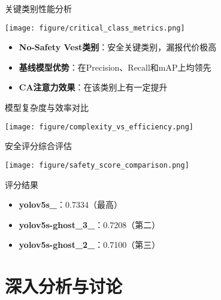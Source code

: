 \documentclass[aspectratio=169]{beamer}
\begin{document}
\begin{frame}{关键类别性能分析}
    \begin{center}
        \texttt{[image: figure/critical\_class\_metrics.png]}
    \end{center}
    
    \begin{itemize}
        \item \textbf{No-Safety Vest类别}：安全关键类别，漏报代价极高
        \item \textbf{基线模型优势}：在Precision、Recall和mAP上均领先
        \item \textbf{CA注意力效果}：在该类别上有一定提升
    \end{itemize}
\end{frame}

\begin{frame}{模型复杂度与效率对比}
    \begin{center}
        \texttt{[image: figure/complexity\_vs\_efficiency.png]}
    \end{center}
\end{frame}

\begin{frame}{安全评分综合评估}
    \begin{center}
        \texttt{[image: figure/safety\_score\_comparison.png]}
    \end{center}
    
    \begin{block}{评分结果}
        \begin{itemize}
            \item \textbf{yolov5s\_}：0.7334（最高）
            \item \textbf{yolov5s-ghost\_3\_}：0.7208（第二）
            \item \textbf{yolov5s-ghost\_2\_}：0.7100（第三）
        \end{itemize}
    \end{block}
\end{frame}

\section{深入分析与讨论}
\end{document}
